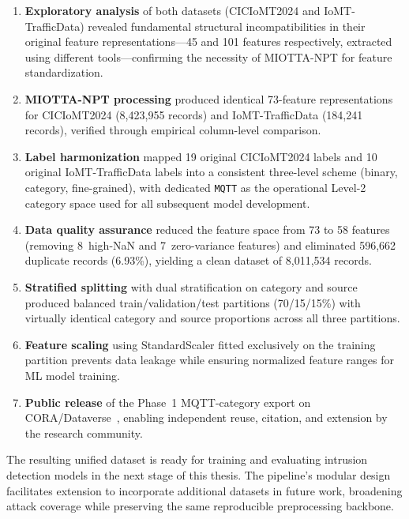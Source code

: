 \begin{enumerate}
    \item \textbf{Exploratory analysis} of both datasets (CICIoMT2024 and IoMT-TrafficData) revealed fundamental structural incompatibilities in their original feature representations---45 and 101 features respectively, extracted using different tools---confirming the necessity of MIOTTA-NPT for feature standardization.

    \item \textbf{MIOTTA-NPT processing} produced identical 73-feature representations for CICIoMT2024 (8,423,955 records) and IoMT-TrafficData (184,241 records), verified through empirical column-level comparison.

    \item \textbf{Label harmonization} mapped 19 original CICIoMT2024 labels and 10 original IoMT-TrafficData labels into a consistent three-level scheme (binary, category, fine-grained), with dedicated \texttt{MQTT} as the operational Level-2 category space used for all subsequent model development.

    \item \textbf{Data quality assurance} reduced the feature space from 73 to 58 features (removing 8~high-NaN and 7~zero-variance features) and eliminated 596,662 duplicate records (6.93\%), yielding a clean dataset of 8,011,534 records.

    \item \textbf{Stratified splitting} with dual stratification on category and source produced balanced train/validation/test partitions (70/15/15\%) with virtually identical category and source proportions across all three partitions.

    \item \textbf{Feature scaling} using StandardScaler fitted exclusively on the training partition prevents data leakage while ensuring normalized feature ranges for ML model training.

    \item \textbf{Public release} of the Phase~1 MQTT-category export on CORA/Dataverse~\cite{unified_iomt_csuc2026}, enabling independent reuse, citation, and extension by the research community.
\end{enumerate}

The resulting unified dataset is ready for training and evaluating intrusion detection models in the next stage of this thesis. The pipeline's modular design facilitates extension to incorporate additional datasets in future work, broadening attack coverage while preserving the same reproducible preprocessing backbone.
